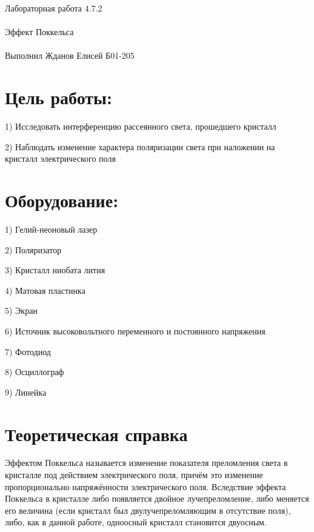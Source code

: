 \documentclass{astroedu-lab}
\begin{document}
\pagestyle{plain}

\begin{problem}{\huge Лабораторная работа 4.7.2\\\\Эффект Поккельса\\\\Выполнил Жданов Елисей Б01-205}

\section{Цель работы:}

1) Исследовать интерференцию рассеянного света, прошедшего кристалл

2) Наблюдать изменение характера поляризации света при наложении на кристалл электрического поля

\section{Оборудование:}

1) Гелий-неоновый лазер

2) Поляризатор

3) Кристалл ниобата лития

4) Матовая пластинка

5) Экран

6) Источник высоковольтного переменного и постоянного напряжения

7) Фотодиод

8) Осциллограф

9) Линейка

\section{Теоретическая справка}

Эффектом Поккельса называется изменение показателя преломления света в кристалле под действием электрического поля, причём это изменение пропорционально напряжённости электрического поля. Вследствие эффекта Поккельса в кристалле либо появляется двойное лучепреломление, либо меняется его величина (если кристалл был двулучепреломляющим в отсутствие поля), либо, как в данной работе, одноосный кристалл становится двуосным.



\end{problem}
\end{document}
